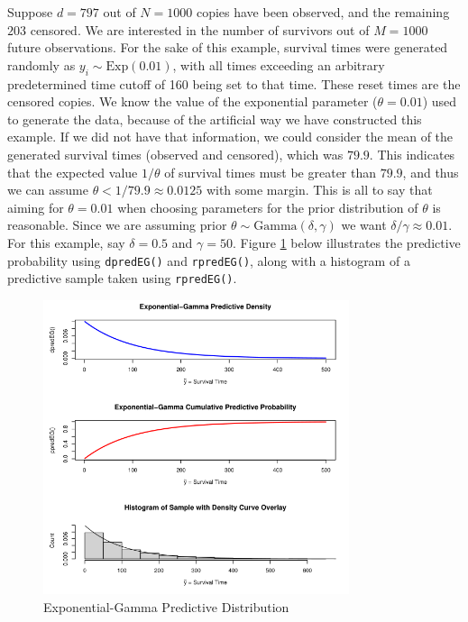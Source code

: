 \documentclass[12pt, a4paper]{article}
\begin{document}
\noindent Suppose $d=797$ out of $N = 1000$ copies have been observed, and the remaining $203$ censored. We are interested in the number of survivors out of $M = 1000$ future observations.  For the sake of this example, survival times were generated randomly as $y_i \sim \text{Exp}(0.01)$, with all times exceeding an arbitrary predetermined time cutoff of 160 being set to that time.  These reset times are the censored copies.  We know the value of the exponential parameter ($\theta = 0.01$) used to generate the data, because of the artificial way we have constructed this example.  If we did not have that information, we could consider the mean of the generated survival times (observed and censored), which was $79.9$.  This indicates that the expected value $1/\theta$ of survival times must be greater than $79.9$, and thus we can assume $\theta < 1/79.9 \approx 0.0125$ with some margin.  This is all to say that aiming for $\theta = 0.01$ when choosing parameters for the prior distribution of $\theta$ is reasonable.  Since we are assuming prior $\theta\sim\text{Gamma}(\delta,\gamma)$ we want $\delta/\gamma \approx 0.01$.   For this example, say $\delta = 0.5$ and $\gamma=50$.  Figure \ref{fig:EGdist} below illustrates the predictive probability using \texttt{dpredEG()} and \texttt{rpredEG()}, along with a histogram of a predictive sample taken using \texttt{rpredEG()}.

\begin{figure}[ht]
  \centering
  \includegraphics[width=0.8\textwidth]{./Graphics/DistributionPlots/ExponentialGamma}
  \caption{Exponential-Gamma Predictive Distribution}
  \label{fig:EGdist}
\end{figure}
\end{document}
